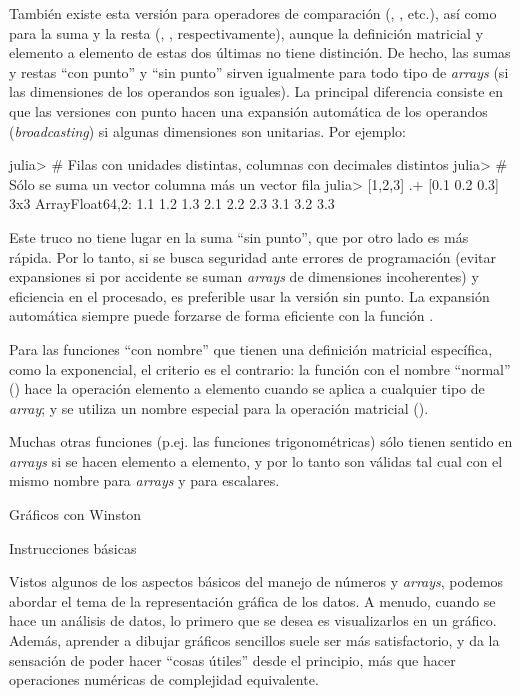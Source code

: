 ﻿\documentclass[spanish]{article}
\begin{document}
También existe esta versión para operadores de comparación (, , etc.), así como para  la suma y la resta (, , respectivamente), aunque la definición matricial y elemento a elemento de estas dos últimas no tiene distinción. De hecho, las sumas y restas ``con punto'' y ``sin punto'' sirven igualmente para todo tipo de \emph{arrays} (si las dimensiones de los operandos son iguales). La principal diferencia consiste en que las versiones con punto hacen una expansión automática de los operandos (\emph{broadcasting}) si algunas dimensiones son unitarias. Por ejemplo:

julia> # Filas con unidades distintas, columnas con decimales distintos
julia> # Sólo se suma un vector columna más un vector fila
julia> [1,2,3] .+ [0.1 0.2 0.3]
3x3 Array{Float64,2}:
 1.1 1.2 1.3
 2.1 2.2 2.3
 3.1 3.2 3.3

Este truco no tiene lugar en la suma ``sin punto'', que por otro lado es más rápida. Por lo tanto, si se busca seguridad ante errores de programación (evitar expansiones si por accidente se suman \emph{arrays} de dimensiones incoherentes) y eficiencia en el procesado, es preferible usar la versión sin punto. La expansión automática siempre puede forzarse de forma eficiente con la función .

Para las funciones ``con nombre'' que tienen una definición matricial específica, como la exponencial, el criterio es el contrario: la función con el nombre ``normal'' () hace la operación elemento a elemento cuando se aplica a cualquier tipo de \emph{array}; y se utiliza un nombre especial para la operación matricial ().

Muchas otras funciones (p.ej. las funciones trigonométricas) sólo tienen sentido en \emph{arrays} si se hacen elemento a elemento, y por lo tanto son válidas tal cual con el mismo nombre para \emph{arrays} y para escalares.




Gráficos con Winston

Instrucciones básicas

Vistos algunos de los aspectos básicos del manejo de números y \emph{arrays}, podemos abordar el tema de la representación gráfica de los datos. A menudo, cuando se hace un análisis de datos, lo primero que se desea es visualizarlos en un gráfico. Además, aprender a dibujar gráficos sencillos suele ser más satisfactorio, y da la sensación de poder hacer ``cosas útiles'' desde el principio, más que hacer operaciones numéricas de complejidad equivalente.
\end{document}

